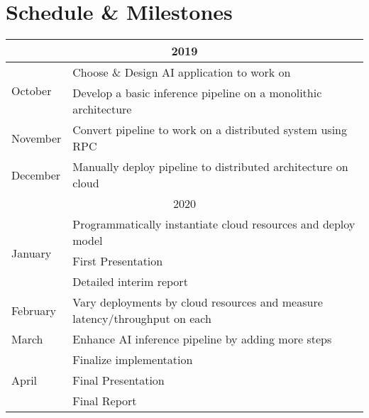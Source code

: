 \documentclass{article}
\begin{document}
\section{Schedule \& Milestones}
\renewcommand{\arraystretch}{2}
\begin{tabular}{ |l|l| } 
\hline
\multicolumn{2}{|c|}{2019} \\ \hline
\multirow{2}{*}{October} & Choose \& Design AI application to work on \\
 & Develop a basic inference pipeline on a monolithic architecture \\ \hline
November & Convert pipeline to work on a distributed system using RPC \\ \hline
December & Manually deploy pipeline to distributed architecture on cloud \\ \hline
\multicolumn{2}{|c|}{2020} \\ \hline
\multirow{3}{*}{January} & Programmatically instantiate cloud resources and deploy model \\
 & First Presentation \\
 & Detailed interim report \\ \hline
February     & Vary deployments by cloud resources and measure latency/throughput on each  \\ \hline
March     & Enhance AI inference pipeline by adding more steps  \\ \hline
\multirow{3}{*}{April} & Finalize implementation \\
 & Final Presentation \\
 & Final Report \\ \hline
\end{tabular}
\renewcommand{\arraystretch}{1}

\printbibliography
\end{document}
